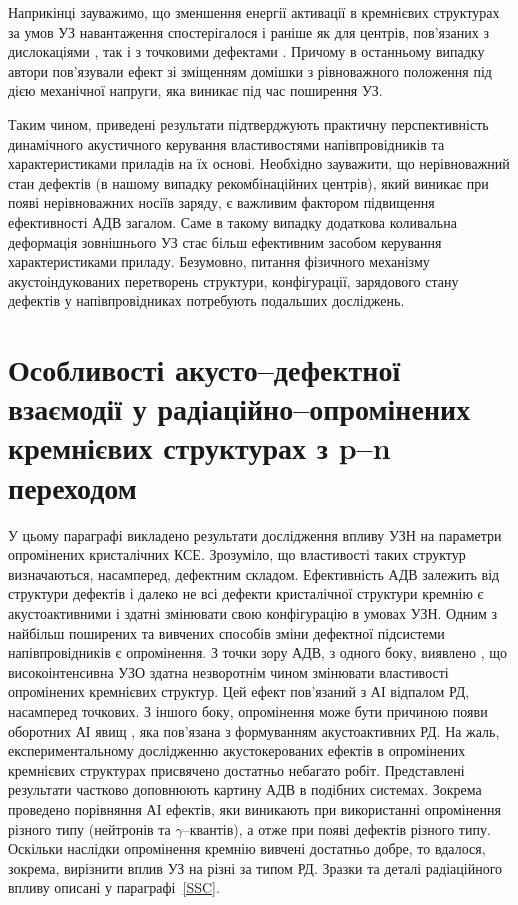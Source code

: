 Наприкінці зауважимо, що зменшення енергії активації в кремнієвих структурах за умов
УЗ навантаження спостерігалося і раніше як для центрів, пов'язаних з дислокаціями \cite{KorotchFTP1996}, так і з точковими дефектами \cite{Korotchenkov1995}.
Причому в останньому випадку автори пов'язували ефект зі зміщенням домішки з рівноважного положення під дією механічної напруги, яка виникає під час поширення УЗ.


Таким чином, приведені результати підтверджують практичну перспективність динамічного акустичного керування властивостями напівпровідників та характеристиками приладів на їх основі.
Необхідно зауважити, що нерівноважний стан дефектів (в нашому випадку рекомбінаційних центрів), який виникає при появі нерівноважних носіїв заряду,
є важливим фактором підвищення ефективності АДВ загалом.
Саме в такому випадку додаткова коливальна деформація зовнішнього УЗ стає більш ефективним засобом керування характеристиками приладу.
Безумовно, питання фізичного механізму акустоіндукованих перетворень структури, конфігурації, зарядового стану дефектів у напівпровідниках потребують подальших досліджень.



\section{Особливості акусто--дефектної взаємодії у радіаційно--опромінених кремнієвих структурах з p--n переходом\label{Rad_SSC}}
У цьому параграфі викладено результати дослідження впливу УЗН на параметри опромінених кристалічних КСЕ.
Зрозуміло, що властивості таких структур визначаються, насамперед, дефектним складом.
Ефективність АДВ залежить від структури дефектів \cite{UST:Medvid} і
далеко не всі дефекти кристалічної структури кремнію є акустоактивними і здатні змінювати свою конфігурацію в умовах УЗН.
Одним з найбільш поширених та вивчених способів зміни дефектної підсистеми напівпровідників є опромінення.
З точки зору АДВ, з одного боку, виявлено \cite{YOlikh2007TPLr,Parchinskii2006r,Gorb2010,Podolian2012r}, що високоінтенсивна УЗО
здатна незворотнім чином змінювати властивості опромінених кремнієвих структур.
Цей ефект пов'язаний з АІ відпалом РД, насамперед точкових.
З іншого боку, опромінення може бути причиною появи оборотних АІ явищ \cite{YOlikh2006TPLr,YOlikhTPL2011r},
яка пов'язана з формуванням акустоактивних РД.
На жаль, експериментальному  дослідженню акустокерованих ефектів в опромінених кремнієвих структурах присвячено достатньо небагато робіт.
Представлені результати частково доповнюють картину АДВ в подібних системах.
Зокрема проведено порівняння АІ ефектів, яки виникають при використанні опромінення різного типу (нейтронів та $\gamma$--квантів),
а отже при появі дефектів різного типу.
Оскільки наслідки опромінення кремнію вивчені достатньо добре, то вдалося, зокрема, вирізнити
вплив УЗ на різні за типом РД.
Зразки та деталі радіаційного впливу описані у параграфі~\ref{SSC}.

